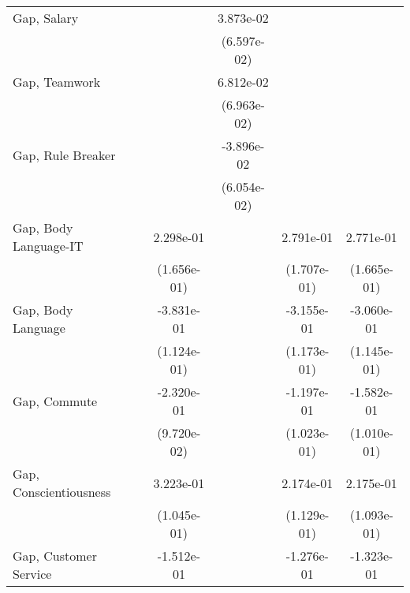 {\begin{tabular}{l*{5}{c}}
\addlinespace
Gap, Salary              &                    &                    &   3.873e-02        &                    &                    \\
                         &                    &                    & (6.597e-02)        &                    &                    \\
\addlinespace
Gap, Teamwork            &                    &                    &   6.812e-02        &                    &                    \\
                         &                    &                    & (6.963e-02)        &                    &                    \\
\addlinespace
Gap, Rule Breaker        &                    &                    &  -3.896e-02        &                    &                    \\
                         &                    &                    & (6.054e-02)        &                    &                    \\
\addlinespace
Gap, Body Language-IT    &                    &   2.298e-01        &                    &   2.791e-01        &   2.771e-01\sym{+} \\
                         &                    & (1.656e-01)        &                    & (1.707e-01)        & (1.665e-01)        \\
\addlinespace
Gap, Body Language       &                    &  -3.831e-01\sym{**}&                    &  -3.155e-01\sym{*} &  -3.060e-01\sym{*} \\
                         &                    & (1.124e-01)        &                    & (1.173e-01)        & (1.145e-01)        \\
\addlinespace
Gap, Commute             &                    &  -2.320e-01\sym{++}&                    &  -1.197e-01        &  -1.582e-01        \\
                         &                    & (9.720e-02)        &                    & (1.023e-01)        & (1.010e-01)        \\
\addlinespace
Gap, Conscientiousness   &                    &   3.223e-01\sym{*} &                    &   2.174e-01\sym{+} &   2.175e-01\sym{++}\\
                         &                    & (1.045e-01)        &                    & (1.129e-01)        & (1.093e-01)        \\
\addlinespace
Gap, Customer Service    &                    &  -1.512e-01        &                    &  -1.276e-01        &  -1.323e-01        \\

\end{tabular}}
